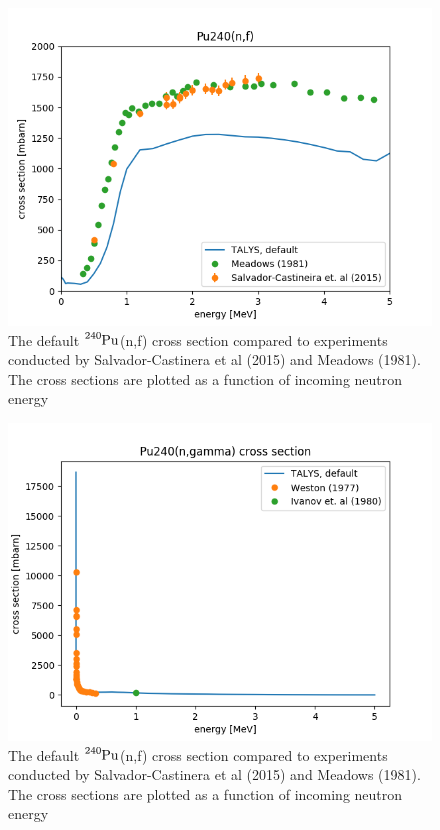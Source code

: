\documentclass[]{article}
\begin{document}
  \begin{figure} [H]
	\centering
	\includegraphics[scale=0.7]{Default_TALYS_fission_xs_to_exp.png}
	\caption{The default $\ce{^{240}Pu}$(n,f) cross section compared to experiments conducted by Salvador-Castinera et al (2015) and Meadows (1981). The cross sections are plotted as a function of incoming neutron energy }
	\label{fig:Default_TALYS_fission_xs_to_exp}
\end{figure}

  \begin{figure} [H]
	\centering
	\includegraphics[scale=0.7]{Default_TALYS_gamma_xs_vs_exp.png}
	\caption{The default $\ce{^{240}Pu}$(n,f) cross section compared to experiments conducted by Salvador-Castinera et al (2015) and Meadows (1981). The cross sections are plotted as a function of incoming neutron energy }
	\label{fig:Default_TALYS_gamma_xs_vs_exp}
\end{figure}
\end{document}
